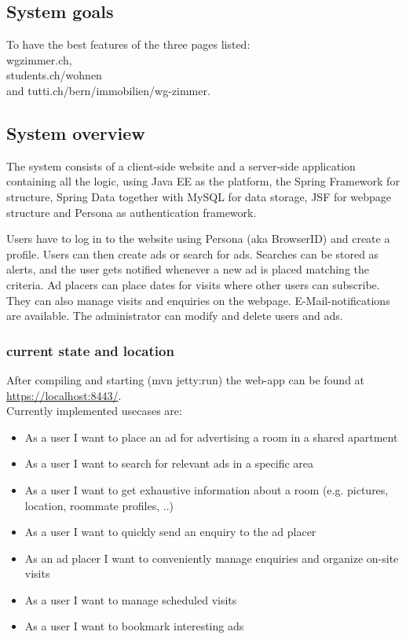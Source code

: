 \documentclass[a4wide]{article}
\begin{document}
\subsection{System goals}
To have the best features of the three pages listed: \\
wgzimmer.ch, \\
students.ch/wohnen \\
and tutti.ch/bern/immobilien/wg-zimmer.

\subsection{System overview}
The system consists of a client-side website and a server-side application containing all the logic, using Java EE as the platform, the Spring Framework for structure, Spring Data together with MySQL for data storage, JSF for webpage structure and Persona as authentication framework.

Users have to log in to the website using Persona (aka BrowserID) and create a profile. Users can then create ads or search for ads. Searches can be stored as alerts, and the user gets notified whenever a new ad is placed matching the criteria. Ad placers can place dates for visits where other users can subscribe. They can also manage visits and enquiries on the webpage. E-Mail-notifications are available.
The administrator can modify and delete users and ads.

\subsubsection{current state and location}
After compiling and starting (mvn jetty:run) the web-app can be found at \href{https://localhost:8443/}{https://localhost:8443/}.\\
Currently implemented usecases are: 
\begin{itemize}
\item As a user I want to place an ad for advertising a room in a shared apartment
\item As a user I want to search for relevant ads in a specific area
\item As a user I want to get exhaustive information about a room (e.g. pictures, location, roommate profiles, ..)
\item As a user I want to quickly send an enquiry to the ad placer 
\item As an ad placer I want to conveniently manage enquiries and organize on-site visits 
\item As a user I want to manage scheduled visits 
\item As a user I want to bookmark interesting ads

\end{itemize}
\end{document}
